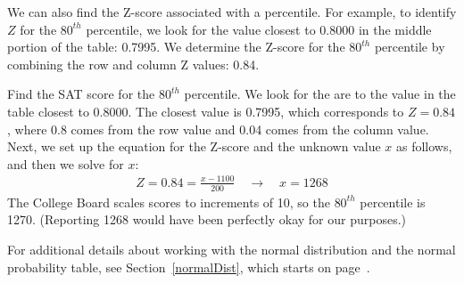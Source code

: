 We can also find the Z-score associated with a percentile.
For example, to identify $Z$ for the $80^{th}$ percentile,
we look for the value closest to 0.8000 in the middle portion
of the table: 0.7995.
We determine the Z-score for the $80^{th}$ percentile by
combining the row and column Z values: 0.84.

\begin{examplewrap}
\begin{nexample}{Find the SAT score for the $80^{th}$ percentile.}
  We look for the are to the value in the table closest to 0.8000.
  The closest value is 0.7995, which corresponds to $Z = 0.84$,
  where 0.8 comes from the row value and 0.04 comes from the
  column value.
  Next, we set up the equation for the Z-score and the unknown
  value $x$ as follows, and then we solve for $x$:
  \begin{align*}
  Z = 0.84 = \frac{x - 1100}{200}
  \quad\to\quad x = 1268
  \end{align*}
  The College Board scales scores to increments of 10,
  so the $80^{th}$ percentile is 1270.
  (Reporting 1268 would have been perfectly okay for our purposes.)
\end{nexample}
\end{examplewrap}

For additional details about working with the normal distribution and the normal probability table, see Section~\ref{normalDist}, which starts on page~\pageref{normalDist}.

